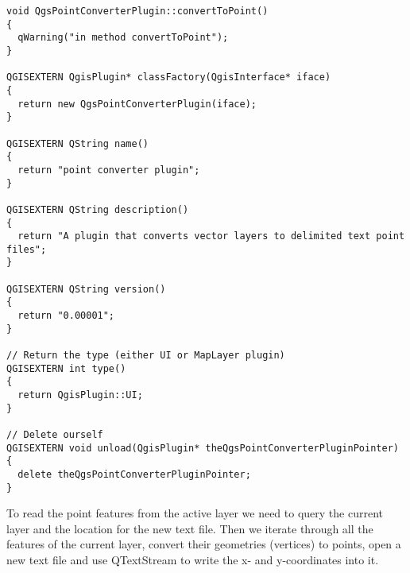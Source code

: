 \begin{verbatim}
void QgsPointConverterPlugin::convertToPoint()
{
  qWarning("in method convertToPoint");
}

QGISEXTERN QgisPlugin* classFactory(QgisInterface* iface)
{
  return new QgsPointConverterPlugin(iface);
}

QGISEXTERN QString name()
{
  return "point converter plugin";
}

QGISEXTERN QString description()
{
  return "A plugin that converts vector layers to delimited text point files";
}

QGISEXTERN QString version()
{
  return "0.00001";
}

// Return the type (either UI or MapLayer plugin)
QGISEXTERN int type()
{
  return QgisPlugin::UI;
}

// Delete ourself
QGISEXTERN void unload(QgisPlugin* theQgsPointConverterPluginPointer)
{
  delete theQgsPointConverterPluginPointer;
}

\end{verbatim}



To read the point features from the active layer we need to query the current
layer and the location for the new text file. Then we iterate through all the
features of the current layer, convert their geometries (vertices) to points,
open a new text file and use QTextStream to write the x- and y-coordinates
into it.

